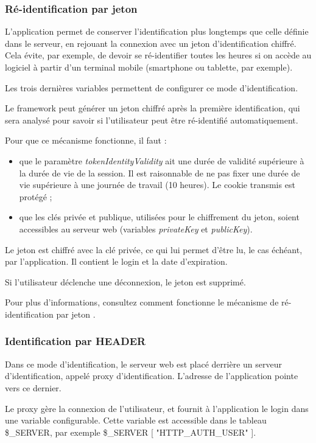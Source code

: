 \subsubsection{Ré-identification par jeton}

L'application permet de conserver l'identification plus longtemps que celle définie dans le serveur, en rejouant la connexion avec un jeton d'identification chiffré. Cela évite, par exemple, de devoir se ré-identifier toutes les heures si on accède au logiciel à partir d'un terminal mobile (smartphone ou tablette, par exemple).

Les trois dernières variables permettent de configurer ce mode d'identification. 

Le framework peut générer un jeton chiffré après la première identification, qui sera analysé pour savoir si l'utilisateur peut être ré-identifié automatiquement.

Pour que ce mécanisme fonctionne, il faut :
\begin{itemize}
\item que le paramètre \textit{tokenIdentityValidity} ait une durée de validité supérieure à la durée de vie de la session. Il est raisonnable de ne pas fixer une durée de vie supérieure à une journée de travail (10 heures). Le cookie transmis est protégé ;
\item que les clés privée et publique, utilisées pour le chiffrement du jeton, soient accessibles au serveur web (variables \textit{privateKey} et \textit{publicKey}).
\end{itemize}

Le jeton est chiffré avec la clé privée, ce qui lui permet d'être lu, le cas échéant, par l'application. Il contient le login et la date d'expiration. 

Si l'utilisateur déclenche une déconnexion, le jeton est supprimé.

Pour plus d'informations, consultez comment fonctionne le mécanisme de ré-identification par jeton \cite{token}.

\subsubsection{Identification par HEADER}

Dans ce mode d'identification, le serveur web est placé derrière un serveur d'identification, appelé proxy d'identification. L'adresse de l'application pointe vers ce dernier. 

Le proxy gère la connexion de l'utilisateur, et fournit à l'application le login dans une variable configurable. Cette variable est accessible dans le tableau \$\_SERVER, par exemple \$\_SERVER [ "HTTP\_AUTH\_USER" ].

